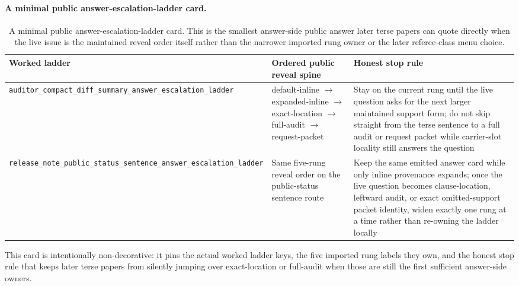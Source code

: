\documentclass[11pt]{article}
\begin{document}
\paragraph{A minimal public answer-escalation-ladder card.}
\begin{table}[t]
\centering
\small
\begin{tabularx}{\linewidth}{@{}L M Y@{}}
\toprule
Worked ladder & Ordered public reveal spine & Honest stop rule \\
\midrule
\nolinkurl{auditor_compact_diff_summary_answer_escalation_ladder} & \textsf{default-inline} $\to$ \textsf{expanded-inline} $\to$ \textsf{exact-location} $\to$ \textsf{full-audit} $\to$ \textsf{request-packet} & Stay on the current rung until the live question asks for the next larger maintained support form; do not skip straight from the terse sentence to a full audit or request packet while carrier-slot locality still answers the question \\
\nolinkurl{release_note_public_status_sentence_answer_escalation_ladder} & Same five-rung reveal order on the public-status sentence route & Keep the same emitted answer card while only inline provenance expands; once the live question becomes clause-location, leftward audit, or exact omitted-support packet identity, widen exactly one rung at a time rather than re-owning the ladder locally \\
\bottomrule
\end{tabularx}
\caption{A minimal public answer-escalation-ladder card. This is the smallest answer-side public answer later terse papers can quote directly when the live issue is the maintained reveal order itself rather than the narrower imported rung owner or the later referee-class menu choice.}
\label{tab:minimal-public-answer-escalation-ladder-card}
\end{table}

This card is intentionally non-decorative: it pins the actual worked ladder keys, the five imported rung labels they own, and the honest stop rule that keeps later terse papers from silently jumping over exact-location or full-audit when those are still the first sufficient answer-side owners.\cite{series:workedexample}
\end{document}

